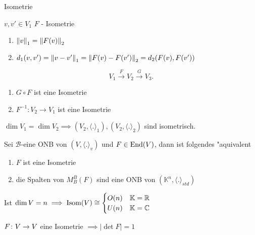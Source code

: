 \documentclass[class=article, crop=false]{standalone}
\begin{document}
\begin{zettel}{Isometrie}
\begin{remark}
	$v,v' \in  V_1$ $F$ - Isometrie
	\begin{enumerate}
		\item $ \left\|v\right\|_1 = \left\|F(v)\right\|_2$
		\item $d_1 (v,v') = \left\|v-v'\right\|_1 = \left\|F(v)-F(v')\right\|_2 = d_2 (F(v),F(v'))$
	\end{enumerate}
\end{remark}

\begin{remark}
	\[
		V_1 \stackrel{F}{\to} V_2 \stackrel{G}{\to} V_3
	.\]
	\begin{enumerate}
		\item $G \circ  F$ ist eine Isometrie
		\item $F^{-1}: V_2 \to  V_1$ ist eine Isometrie
	\end{enumerate}
\end{remark}

\begin{corollary}
	$\dim V_1 = \dim V_2 \implies  (V_2, \langle .\rangle_1), (V_2, \langle .\rangle_2)$  sind isometrisch.
\end{corollary}

\begin{theorem}[7.5]
	Sei $\mathcal{B}$-eine ONB von $(V, \langle .\rangle_v)$ und $F \in  \operatorname{End}(V)$, dann ist folgendes "aquivalent
	\begin{enumerate}
		\item $F$ ist eine Isometrie
		\item die Spalten von $M_B^B (F) $ sind eine ONB von $( \mathbb{K}^n, \langle .\rangle_{std})$
	\end{enumerate}
\end{theorem}

\begin{corollary}
	Ist $\dim V =n \implies \operatorname{Isom} (V) \cong \begin{cases} O (n) & \mathbb{K} = \mathbb{R} \\ U (n) & \mathbb{K} = \mathbb{C} \end{cases} $
\end{corollary}

\begin{corollary}
	$F \colon V\to V$ eine Isometrie $\implies |\det F| =1$
\end{corollary}


\end{zettel}
\end{document}
